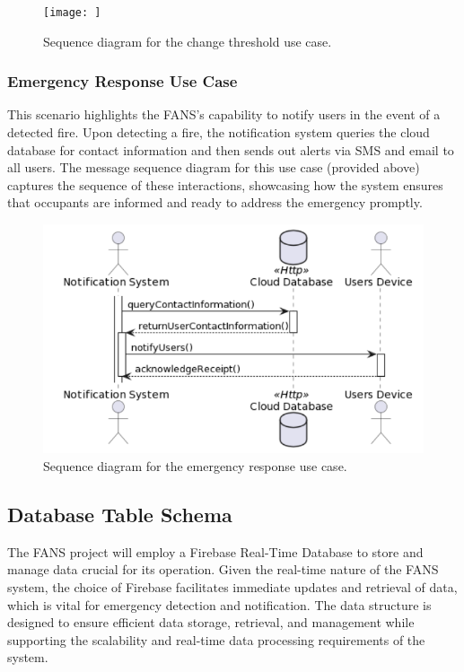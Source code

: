 \begin{figure}[H]
    \centering
    \texttt{[image: ]}
    \caption{Sequence diagram for the change threshold use case.}
\end{figure}

\subsubsection{Emergency Response Use Case}

This scenario highlights the FANS's capability to notify users in the event of a detected fire. Upon detecting a fire,
the notification system queries the cloud database for contact information and then sends out alerts via SMS and email
to all users. The message sequence diagram for this use case (provided above) captures the sequence of these
interactions, showcasing how the system ensures that occupants are informed and ready to address the emergency
promptly.

\begin{figure}[H]
    \centering
    \includegraphics[width=\linewidth]{../assets/EmergencyResponseUseCase.png}
    \caption{Sequence diagram for the emergency response use case.}
\end{figure}

\subsection{Database Table Schema}

The FANS project will employ a Firebase Real-Time Database to store and manage data crucial for its operation. Given
the real-time nature of the FANS system, the choice of Firebase facilitates immediate updates and retrieval of data,
which is vital for emergency detection and notification. The data structure is designed to ensure efficient data
storage, retrieval, and management while supporting the scalability and real-time data processing requirements of the
system.


